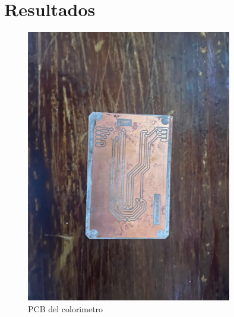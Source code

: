 \documentclass[12pt]{report}
\begin{document}
\section{Resultados}
  \begin{figure}[H]
      \centering
      \includegraphics[width=0.8\textwidth]{screenshots/PlacaLista.jpeg}
      \caption{PCB del colorimetro }
      \label{fig:PCB}
  \end{figure}

\newpage
\end{document}
